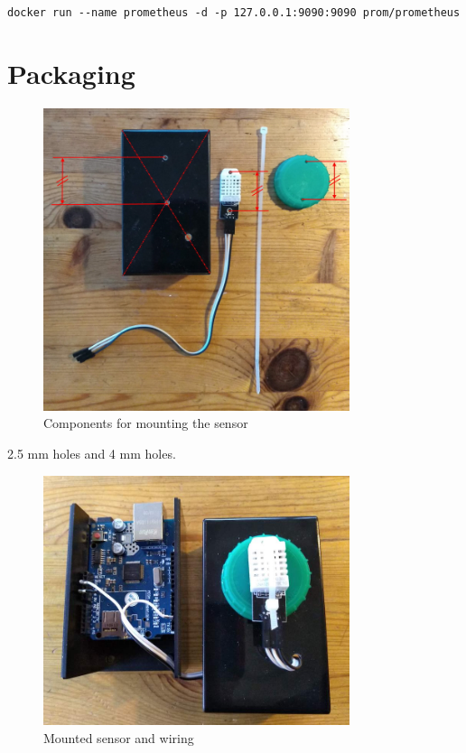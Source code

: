 \documentclass[a4paper, 12pt]{article}
\begin{document}
  \verb|docker run --name prometheus -d -p 127.0.0.1:9090:9090 prom/prometheus|

\section{Packaging}

\begin{figure}[H]
  \centering
  \includegraphics[width=0.8\textwidth]{sensor-mount.jpg}
  \caption{Components for mounting the sensor}
\end{figure}



2.5 mm holes and 4 mm holes.

\begin{figure}[H]
  \centering
  \includegraphics[width=0.8\textwidth]{packaging.jpg}
  \caption{Mounted sensor and wiring}
\end{figure}
\end{document}
